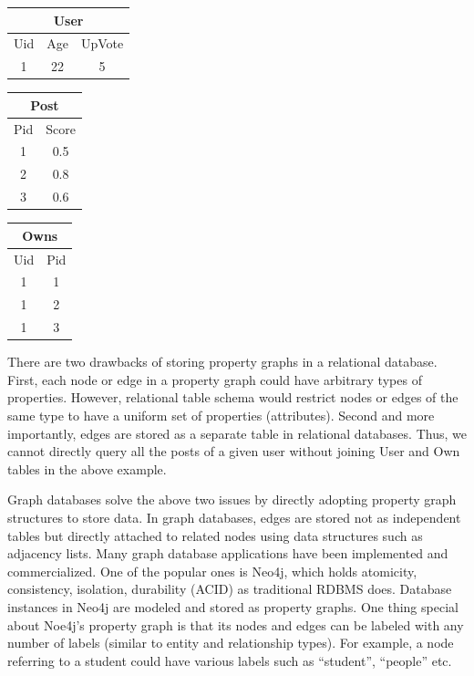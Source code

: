 \begin{center}
\begin{tabular}{|c|c|c| }
	\hline
	\multicolumn{3}{|c|}{User} \\\hline
	Uid	& Age & UpVote	\\ \hline
	1 & 22 & 5 \\\hline
\end{tabular}
\end {center}


\begin{center}
	\begin{tabular}{|c|c|}
	\hline
	\multicolumn{2}{|c|}{Post} \\\hline
		Pid	& Score	\\ \hline
		1	& 0.5 \\
		2	& 0.8 \\
		3	& 0.6 \\\hline
	\end{tabular}
	\end {center}	


\begin{center}
	\begin{tabular}{|c|c|}
	\hline
	\multicolumn{2}{|c|}{Owns} \\\hline
		Uid	& Pid	\\ \hline
		1	&1 \\
		1	&2 \\
		1	&3 \\\hline
	\end{tabular}
	\end {center}


There are two drawbacks of storing property graphs in a relational database. First, each node or edge in a property graph could have arbitrary types of properties. However, relational table schema would restrict nodes or edges of the same type to have a uniform set of properties (attributes). Second and more importantly, edges are stored as a separate table in relational databases. Thus, we cannot directly query all the posts of a given user without joining User and Own tables in the above example.

Graph databases solve the above two issues by directly adopting property graph structures to store data. In graph databases, edges are stored not as independent tables but directly attached to related nodes using data structures such as adjacency lists. Many graph database applications have been implemented and commercialized. One of the popular ones is Neo4j, which holds atomicity, consistency, isolation, durability (ACID) as traditional RDBMS does. Database instances in Neo4j are modeled and stored as  property graphs. %
One thing special about Noe4j’s property graph is that its nodes and edges can be labeled with any number of labels (similar to entity and relationship types). For example, a node referring to a student could have various labels such as “student”, “people” etc.

